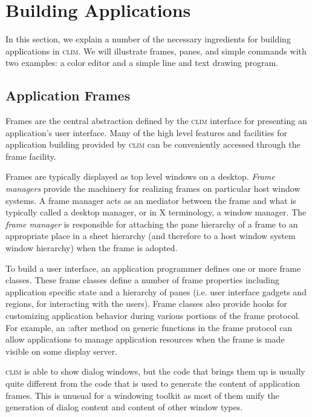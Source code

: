 \documentclass[twocolumn,a4paper]{article}
\newcommand {\concept} [1] {{\sl #1}\index{#1}}
\newcommand {\code}[1]{{\sffamily #1}}
\newcommand {\CLIM}{\textsc{clim}}
\let\keyword\code
\begin{document}
\section{Building Applications} 

In this section, we explain a number of the necessary ingredients for
building applications in \CLIM{}. We will illustrate frames, panes,
and simple commands with two examples: a color editor and a simple
line and text drawing program.

\subsection{Application Frames} 

Frames are the central abstraction defined by the \CLIM{} interface
for presenting an application's user interface. Many of the high level
features and facilities for application building provided by \CLIM{}
can be conveniently accessed through the frame facility.

Frames are typically displayed as top level windows on a desktop.
\concept{Frame managers} provide the machinery for realizing frames on
particular host window systems. A frame manager acts as an mediator
between the frame and what is typically called a desktop manager, or
in X terminology, a window manager. The \concept{frame manager} is
responsible for attaching the pane hierarchy of a frame to an
appropriate place in a sheet hierarchy (and therefore to a host window
system window hierarchy) when the frame is adopted.

To build a user interface, an application programmer defines one or
more frame classes. These frame classes define a number of frame
properties including application specific state and a hierarchy of
panes (i.e.{} user interface gadgets and regions, for interacting with
the users). Frame classes also provide hooks for customizing
application behavior during various portions of the frame protocol.
For example, an \keyword{:after} method on generic functions in the
frame protocol can allow applications to manage application resources
when the frame is made visible on some display server.

\CLIM{} is able to show dialog windows, but the code that brings them
up is usually quite different from the code that is used to generate
the content of application frames. This is unusual for a windowing
toolkit as most of them unify the generation of dialog content and
content of other window types.
\end{document}
